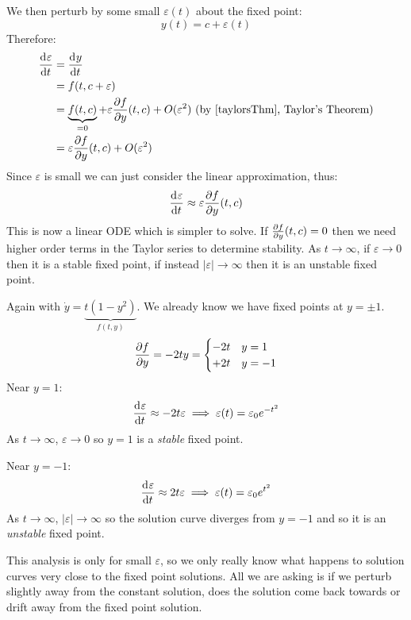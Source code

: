\documentclass[../main.tex]{subfiles}
\begin{document}
We then perturb by some small $\varepsilon(t)$ about the fixed point:
\[
  y(t) = c + \varepsilon(t)
\]
Therefore:
\begin{align*}
  \deriv{\varepsilon}{t} &= \deriv{y}{t} \\
                         &= f(t, c + \varepsilon) \\
                         &= \underbrace{f(t, c)}_{=0} + \varepsilon \pderiv{f}{y}(t, c) + O(\varepsilon^2) \text{ (by \cref{taylorsThm}, Taylor's Theorem)}\\
                         &= \varepsilon \pderiv{f}{y}(t, c) + O(\varepsilon^2)
\end{align*}
Since $\varepsilon$ is small we can just consider the linear approximation, thus:
\[
  \deriv{\varepsilon}{t} \approx \varepsilon \pderiv{f}{y}(t, c)
\]
This is now a linear ODE which is simpler to solve.
If $\pderiv{f}{y}(t, c) = 0$ then we need higher order terms in the Taylor series to determine stability.
As $t \to \infty$, if $\varepsilon \to 0$ then it is a stable fixed point, if instead $|\varepsilon| \to \infty$ then it is an unstable fixed point.
\begin{example}
  Again with $\dot{y} = \underbrace{t(1 - y^2)}_{f(t, y)}$.
  We already know we have fixed points at $y = \pm 1$.
  \[
    \pderiv{f}{y} = -2ty = \begin{cases}
    -2t & y = 1 \\
    +2t & y = -1
    \end{cases}
  \]
  Near $y = 1$:
  \[
    \deriv{\varepsilon}{t} \approx -2t\varepsilon \implies
    \varepsilon(t) = \varepsilon_0 e^{-t^2}
  \]
  As $t \to \infty$, $\varepsilon \to 0$ so $y = 1$ is a \textit{stable} fixed point.

  Near $y = -1$:
  \[
    \deriv{\varepsilon}{t} \approx 2t\varepsilon \implies
    \varepsilon(t) = \varepsilon_0 e^{t^2}
  \]
  As $t \to \infty$, $|\varepsilon| \to \infty$ so the solution curve diverges from $y =-1$ and so it is an \textit{unstable} fixed point.

  This analysis is only for small $\varepsilon$, so we only really know what happens to solution curves very close to the fixed point solutions.
  All we are asking is if we perturb slightly away from the constant solution, does the solution come back towards or drift away from the fixed point solution.
\end{example}
\end{document}

